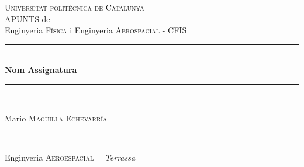 \documentclass[11pt]{article}
\begin{document}
\begin{titlepage}

\newcommand{\HRule}{\rule{\linewidth}{0.5mm}} %

\center %
 

\textsc{\LARGE Universitat politécnica de Catalunya}\\[1.5cm] %
APUNTS de\\[0.3cm]
Enginyeria \textsc{\Large Física} i Enginyeria \textsc{\Large Aerospacial - CFIS}\\[0.5cm] %


\HRule \\[0.4cm]
{ \huge \bfseries
Nom Assignatura
}\\[0.4cm] %
\HRule \\[1.5cm]
 

\begin{minipage}{0.4\textwidth}
\begin{flushleft} \large

Mario \textsc{Maguilla Echevarría}  \\
\end{flushleft}
\end{minipage}
~
\begin{minipage}{0.4\textwidth}
\begin{flushright} \large
Enginyeria \textsc{Aeroespacial} \ \ \textit{Terrassa}
\end{flushright}
\end{minipage}\\[2cm]


\end{titlepage}
\end{document}
